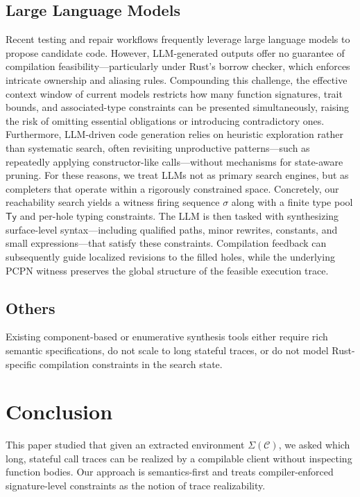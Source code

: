 \documentclass[runningheads]{llncs}
\begin{document}
\subsection{Large Language Models}
Recent testing and repair workflows frequently leverage large language models to propose candidate code. However, LLM-generated outputs offer no guarantee of compilation feasibility—particularly under Rust’s borrow checker, which enforces intricate ownership and aliasing rules. Compounding this challenge, the effective context window of current models restricts how many function signatures, trait bounds, and associated-type constraints can be presented simultaneously, raising the risk of omitting essential obligations or introducing contradictory ones. Furthermore, LLM-driven code generation relies on heuristic exploration rather than systematic search, often revisiting unproductive patterns—such as repeatedly applying constructor-like calls—without mechanisms for state-aware pruning. For these reasons, we treat LLMs not as primary search engines, but as completers that operate within a rigorously constrained space.
Concretely, our reachability search yields a witness firing sequence $\sigma$ along with a finite type pool $\widehat{\mathsf{Ty}}$ and per-hole typing constraints. The LLM is then tasked with synthesizing surface-level syntax—including qualified paths, minor rewrites, constants, and small expressions—that satisfy these constraints. Compilation feedback can subsequently guide localized revisions to the filled holes, while the underlying PCPN witness preserves the global structure of the feasible execution trace.

\subsection{Others}
Existing component-based or enumerative synthesis tools either require rich semantic specifications, do not scale to long stateful traces, or do not model Rust-specific compilation constraints in the search state. 


\section{Conclusion}
\label{sec:conclusion}
This paper studied that given an extracted environment $\Sigma(\mathcal{C})$, we asked which long, stateful call traces can be realized by a compilable client without inspecting function bodies. Our approach is semantics-first and treats compiler-enforced signature-level constraints as the notion of trace realizability.
\end{document}
